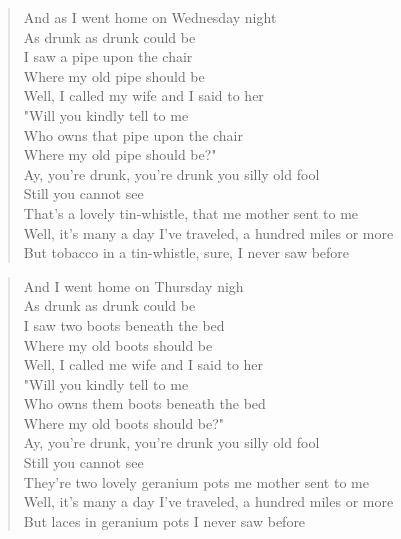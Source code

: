 \documentclass[8pt,twoside]{extarticle}
\newenvironment{xverse}{
	\interlinepenalty 10000
	\begin{verse}
	\begin{minipage}{\linewidth}
	\parskip 5pt
	\vspace{-6pt}
	}
	{
	\end{minipage}
	\end{verse}
	\penalty 0
	\vspace{-6pt}
	}
\begin{document}
\begin{xverse}
And as I went home on Wednesday night \\
As drunk as drunk could be \\
I saw a pipe upon the chair \\
Where my old pipe should be \\
Well, I called my wife and I said to her \\
"Will you kindly tell to me \\
Who owns that pipe upon the chair \\
Where my old pipe should be?" \\
Ay, you're drunk, you're drunk you silly old fool \\
Still you cannot see \\
That's a lovely tin-whistle, that me mother sent to me \\
Well, it's many a day I've traveled, a hundred miles or more \\
But tobacco in a tin-whistle, sure, I never saw before \\
\end{xverse}

\begin{xverse}
And I went home on Thursday nigh \\
As drunk as drunk could be \\
I saw two boots beneath the bed \\
Where my old boots should be \\
Well, I called me wife and I said to her \\
"Will you kindly tell to me \\
Who owns them boots beneath the bed \\
Where my old boots should be?" \\
Ay, you're drunk, you're drunk you silly old fool \\
Still you cannot see \\
They're two lovely geranium pots me mother sent to me \\
Well, it's many a day I've traveled, a hundred miles or more \\
But laces in geranium pots I never saw before \\
\end{xverse}
\end{document}
